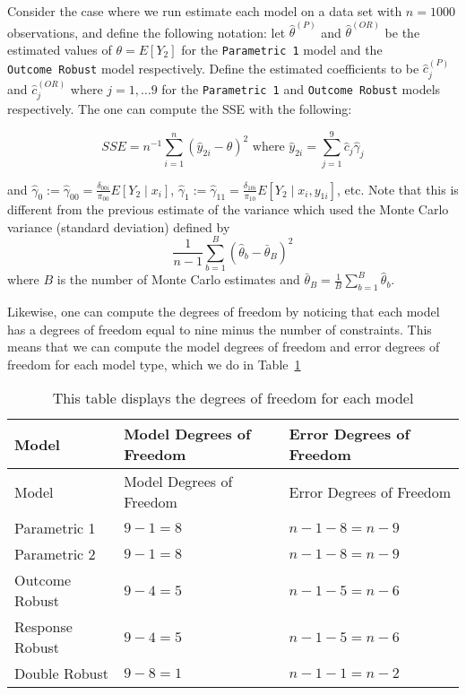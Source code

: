 \documentclass[
  letterpaper,
  DIV=11,
  numbers=noendperiod]{scrartcl}
\begin{document}
Consider the case where we run estimate each model on a data set with
\(n = 1000\) observations, and define the following notation: let
\(\hat \theta^{(P)}\) and \(\hat \theta^{(OR)}\) be the estimated values
of \(\theta = E[Y_2]\) for the \texttt{Parametric\ 1} model and the
\texttt{Outcome\ Robust} model respectively. Define the estimated
coefficients to be \(\hat c_j^{(P)}\) and \(\hat c_j^{(OR)}\) where
\(j = 1, \dots 9\) for the \texttt{Parametric\ 1} and
\texttt{Outcome\ Robust} models respectively. The one can compute the
SSE with the following:

\[ SSE = n^{-1} \sum_{i = 1}^n (\hat y_{2i} - \theta)^2 \text{ where }
\hat y_{2i} = \sum_{j = 1}^9 \hat c_j \hat \gamma_j \]

and
\(\hat \gamma_0 := \hat \gamma_{00} = \frac{\delta_{00i}}{\pi_{00}} E[Y_2 \mid x_i]\),
\(\hat \gamma_1 := \hat \gamma_{11} = \frac{\delta_{10i}}{\pi_{10}} E[Y_2 \mid x_i, y_{1i}]\),
etc. Note that this is different from the previous estimate of the
variance which used the Monte Carlo variance (standard deviation)
defined by
\[ \frac{1}{n - 1} \sum_{b = 1}^B (\hat \theta_b - \bar \theta_B)^2 \]
where \(B\) is the number of Monte Carlo estimates and
\(\bar \theta_B = \frac{1}{B} \sum_{b = 1}^B \hat \theta_b\).

Likewise, one can compute the degrees of freedom by noticing that each
model has a degrees of freedom equal to nine minus the number of
constraints. This means that we can compute the model degrees of freedom
and error degrees of freedom for each model type, which we do in
Table~\ref{tbl-df}

\hypertarget{tbl-df}{}
\begin{longtable}[]{@{}lll@{}}
\caption{\label{tbl-df}This table displays the degrees of freedom for
each model}\tabularnewline
\toprule\noalign{}
Model & Model Degrees of Freedom & Error Degrees of Freedom \\
\midrule\noalign{}
\endfirsthead
\toprule\noalign{}
Model & Model Degrees of Freedom & Error Degrees of Freedom \\
\midrule\noalign{}
\endhead
\bottomrule\noalign{}
\endlastfoot
Parametric 1 & \(9 - 1 = 8\) & \(n - 1 - 8 = n - 9\) \\
Parametric 2 & \(9 - 1 = 8\) & \(n - 1 - 8 = n - 9\) \\
Outcome Robust & \(9 - 4 = 5\) & \(n - 1 - 5 = n - 6\) \\
Response Robust & \(9 - 4 = 5\) & \(n - 1 - 5 = n - 6\) \\
Double Robust & \(9 - 8 = 1\) & \(n - 1 - 1 = n - 2\) \\
\end{longtable}
\end{document}
